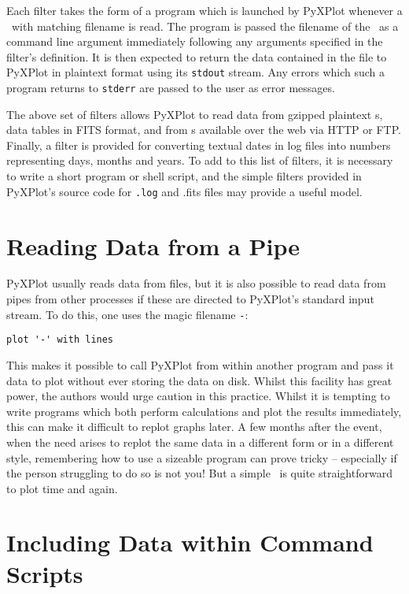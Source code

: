 Each filter takes the form of a program which is launched by PyXPlot whenever a
\datafile\ with matching filename is read. The program is passed the filename of
the \datafile\ as a command line argument immediately following any arguments
specified in the filter's definition. It is then expected to return the data
contained in the file to PyXPlot in plaintext format using its {\tt stdout}
stream. Any errors which such a program returns to {\tt stderr} are passed to
the user as error messages.

The above set of filters allows PyXPlot to read data from gzipped plaintext
\datafile s, data tables in FITS format, and from \datafile
s available over the web via HTTP or FTP. Finally, a
filter is provided for converting textual dates in log files into numbers
representing days, months and years. To add to this list of filters, it is
necessary to write a short program or shell script, and the simple filters
provided in PyXPlot's source code for {\tt .log} and {.fits} files may provide
a useful model.

\section{Reading Data from a Pipe}

PyXPlot usually reads data from files, but it is also possible to read data
from pipes from other processes if these are directed to PyXPlot's standard
input stream.  To do this, one uses the magic filename {\tt -}:

\begin{verbatim}
plot '-' with lines
\end{verbatim}

This makes it possible to call PyXPlot from within another program and pass it
data to plot without ever storing the data on disk. Whilst this facility has
great power, the authors would urge caution in this practice.  Whilst it is
tempting to write programs which both perform calculations and plot the results
immediately, this can make it difficult to replot graphs later. A few months
after the event, when the need arises to replot the same data in a different
form or in a different style, remembering how to use a sizeable program can
prove tricky -- especially if the person struggling to do so is not you! But a
simple \datafile\ is quite straightforward to plot time and again.

\section{Including Data within Command Scripts}


